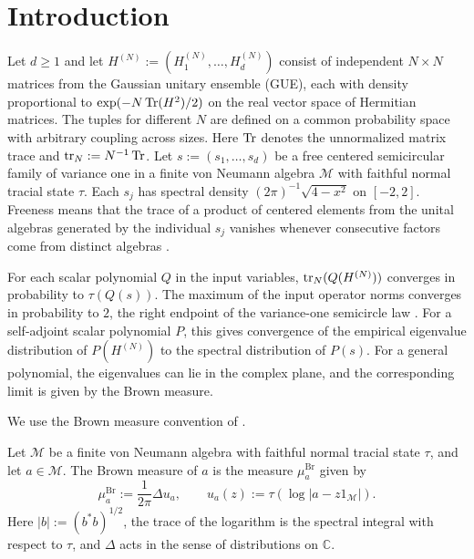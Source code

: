 \section{Introduction}\label{sec:introduction}

Let $d\ge 1$ and let $H^{(N)}:=(H_1^{(N)},\ldots,H_d^{(N)})$ consist of independent $N\times N$ matrices from the Gaussian unitary ensemble (GUE), each with density proportional to $\exp(-N\operatorname{Tr}(H^2)/2)$ on the real vector space of Hermitian matrices.
The tuples for different $N$ are defined on a common probability space with arbitrary coupling across sizes.
Here $\operatorname{Tr}$ denotes the unnormalized matrix trace and $\operatorname{tr}_N:=N^{-1}\operatorname{Tr}$.
Let $s:=(s_1,\ldots,s_d)$ be a free centered semicircular family of variance one in a finite von Neumann algebra $\mathcal M$ with faithful normal tracial state $\tau$.
Each $s_j$ has spectral density $(2\pi)^{-1}\sqrt{4-x^2}$ on $[-2,2]$.
Freeness means that the trace of a product of centered elements from the unital algebras generated by the individual $s_j$ vanishes whenever consecutive factors come from distinct algebras \cite[Definition~2.16, Remark~2.17(2), and Definition~5.3]{NS06}.

For each scalar polynomial $Q$ in the input variables, $\operatorname{tr}_N(Q(H^{(N)}))$ converges in probability to $\tau(Q(s))$.
The maximum of the input operator norms converges in probability to $2$, the right endpoint of the variance-one semicircle law \cite[pp.~1--2 of arXiv v1]{CGP22}.
For a self-adjoint scalar polynomial $P$, this gives convergence of the empirical eigenvalue distribution of $P(H^{(N)})$ to the spectral distribution of $P(s)$.
For a general polynomial, the eigenvalues can lie in the complex plane, and the corresponding limit is given by the Brown measure.

We use the Brown measure convention of \cite[Chapter~11, Theorem~5, Definition~6 and pp.~268--270]{MS17}.

\begin{definition}\label{def:brown-measure}
Let $\mathcal M$ be a finite von Neumann algebra with faithful normal tracial state $\tau$, and let $a\in\mathcal M$.
The Brown measure of $a$ is the measure $\mu_a^{\mathrm{Br}}$ given by
\[
 \mu_a^{\mathrm{Br}}:=\frac{1}{2\pi}\Delta u_a,\qquad
 u_a(z):=\tau(\log|a-z1_{\mathcal M}|).
\]
Here $|b|:=(b^*b)^{1/2}$, the trace of the logarithm is the spectral integral with respect to $\tau$, and $\Delta$ acts in the sense of distributions on $\mathbb C$.
\end{definition}

